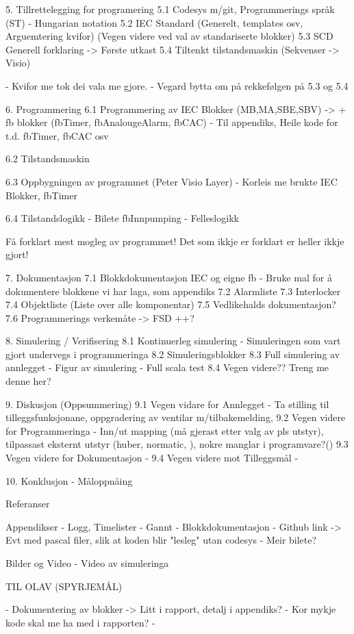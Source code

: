 5. Tillrettelegging for programering
    5.1 Codesys m/git, Programmerings språk (ST) - Hungarian notation
    5.2 IEC Standard (Generelt, templates osv, Arguemtering kvifor) (Vegen videre ved val av standariserte blokker)
    5.3 SCD Generell forklaring -> Første utkast
    5.4 Tiltenkt tilstandsmaskin (Sekvenser -> Visio)
  
    - Kvifor me tok dei vala me gjore.
    - Vegard bytta om på rekkefølgen på 5.3 og 5.4


6. Programmering
    6.1 Programmering av IEC Blokker (MB,MA,SBE,SBV) -> + fb blokker (fbTimer, fbAnalougeAlarm, fbCAC)
    - Til appendiks, Heile kode for t.d. fbTimer, fbCAC osv
   
    6.2 Tilstandsmaskin

    6.3 Oppbygningen av programmet (Peter Visio Layer)
    - Korleis me brukte IEC Blokker, fbTimer

    6.4 Tilstandslogikk
    - Bilete fbInnpumping
    - Felleslogikk

    Få forklart mest mogleg av programmet!
    Det som ikkje er forklart er heller ikkje gjort!

7. Dokumentasjon
    7.1 Blokkdokumentasjon IEC og eigne fb
    - Bruke mal for å dokumentere blokkene vi har laga, som appendiks
    7.2 Alarmliste
    7.3 Interlocker
    7.4 Objektliste (Liste over alle komponentar)
    7.5 Vedlikehalds dokumentasjon? 
    7.6 Programmerings verkemåte -> FSD
    ++?


8. Simulering / Verifisering
    8.1 Kontinuerleg simulering
    - Simuleringen som vart gjort undervegs i programmeringa
    8.2 Simuleringsblokker
    8.3 Full simulering av annlegget
    - Figur av simulering
    - Full scala test
    8.4 Vegen videre?? Treng me denne her?

9. Diskusjon (Oppsummering)
    9.1 Vegen vidare for Annlegget      - Ta stilling til tilleggsfunksjonane, oppgradering av ventilar m/tilbakemelding, 
    9.2 Vegen videre for Programmeringa - Inn/ut mapping (må gjerast etter valg av pls utstyr), tilpassast eksternt utstyr (huber, normatic, ), 
                                          nokre manglar i programvare?()
    9.3 Vegen videre for Dokumentasjon  - 
    9.4 Vegen videre mot Tilleggsmål    - 

10. Konklusjon 
    - Måloppnåing


Referanser

Appendikser
- Logg, Timelister
- Gannt
- Blokkdokumentasjon
- Github link -> Evt med pascal filer, slik at koden blir "lesleg" utan codesys
- Meir bilete?

Bilder og Video
- Video av simuleringa



TIL OLAV (SPYRJEMÅL)

- Dokumentering av blokker -> Litt i rapport, detalj i appendiks?
- Kor mykje kode skal me ha med i rapporten?
- 

